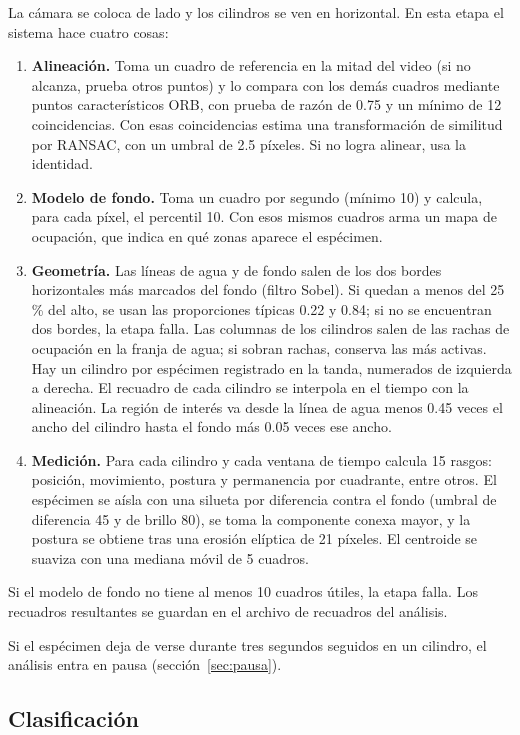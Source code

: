 La cámara se coloca de lado y los cilindros se ven en horizontal. En esta etapa el sistema hace cuatro cosas:

\begin{enumerate}
  \item \textbf{Alineación.} Toma un cuadro de referencia en la mitad del video (si no alcanza, prueba otros
  puntos) y lo compara con los demás cuadros mediante puntos característicos ORB, con prueba de razón de 0.75 y un
  mínimo de 12 coincidencias. Con esas coincidencias estima una transformación de similitud por RANSAC, con un umbral
  de 2.5 píxeles. Si no logra alinear, usa la identidad.
  \item \textbf{Modelo de fondo.} Toma un cuadro por segundo (mínimo 10) y calcula, para cada píxel, el percentil 10.
  Con esos mismos cuadros arma un mapa de ocupación, que indica en qué zonas aparece el espécimen.
  \item \textbf{Geometría.} Las líneas de agua y de fondo salen de los dos bordes horizontales más marcados del fondo (filtro Sobel).
  Si quedan a menos del 25\,\% del alto, se usan las proporciones típicas 0.22 y 0.84; si no se encuentran dos bordes, la etapa falla. Las columnas de los cilindros salen de las rachas de
  ocupación en la franja de agua; si sobran rachas, conserva las más activas. Hay un cilindro por espécimen registrado
  en la tanda, numerados de izquierda a derecha. El recuadro de cada cilindro se interpola en el tiempo con la
  alineación. La región de interés va desde la línea de agua menos 0.45 veces el ancho del cilindro hasta el fondo más
  0.05 veces ese ancho.
  \item \textbf{Medición.} Para cada cilindro y cada ventana de tiempo calcula 15 rasgos: posición, movimiento, postura y
  permanencia por cuadrante, entre otros. El espécimen se aísla con una silueta por diferencia contra el fondo (umbral de
  diferencia 45 y de brillo 80), se toma la componente conexa mayor, y la postura se obtiene tras una erosión elíptica
  de 21 píxeles. El centroide se suaviza con una mediana móvil de 5 cuadros.
\end{enumerate}

Si el modelo de fondo no tiene al menos 10 cuadros útiles, la etapa falla. Los recuadros resultantes se guardan en el
archivo de recuadros del análisis.

Si el espécimen deja de verse durante tres segundos seguidos en un cilindro, el análisis entra en pausa
(sección~\ref{sec:pausa}).

\subsection{Clasificación}

